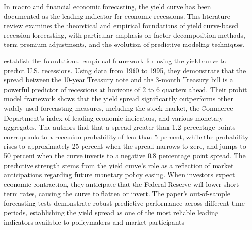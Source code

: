 
In macro and financial economic forecasting, the yield curve has been documented as the leading indicator for economic recessions. This literature review examines the theoretical and empirical foundations of yield curve-based recession forecasting, with particular emphasis on factor decomposition methods, term premium adjustments, and the evolution of predictive modeling techniques.

\citet{estrellaYieldCurvePredictor1996} establish the foundational empirical framework for using the yield curve to predict U.S. recessions. Using data from 1960 to 1995, they demonstrate that the spread between the 10-year Treasury note and the 3-month Treasury bill is a powerful predictor of recessions at horizons of 2 to 6 quarters ahead. Their probit model framework shows that the yield spread significantly outperforms other widely used forecasting measures, including the stock market, the Commerce Department's index of leading economic indicators, and various monetary aggregates. The authors find that a spread greater than 1.2 percentage points corresponds to a recession probability of less than 5 percent, while the probability rises to approximately 25 percent when the spread narrows to zero, and jumps to 50 percent when the curve inverts to a negative 0.8 percentage point spread. The predictive strength stems from the yield curve's role as a reflection of market anticipations regarding future monetary policy easing. When investors expect economic contraction, they anticipate that the Federal Reserve will lower short-term rates, causing the curve to flatten or invert. The paper's out-of-sample forecasting tests demonstrate robust predictive performance across different time periods, establishing the yield spread as one of the most reliable leading indicators available to policymakers and market participants.

